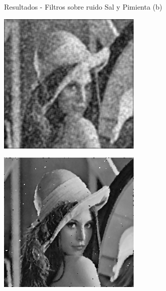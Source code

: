 \documentclass{beamer}
\begin{document}
\begin{frame}[fragile]{Resultados - Filtros sobre ruido Sal y Pimienta (b)}
\begin{minipage}{0.32\linewidth}
		\includegraphics[width=\linewidth]{../results/lena_ej12b1}
		\label{fig:lenaej12b1}
	\end{minipage}\hfill
	\begin{minipage}{0.32\linewidth}
		\centering
		\includegraphics[width=\linewidth]{../results/lena_ej12b2}
		\label{fig:lenaej12b2}
	\end{minipage}
\end{frame}
\end{document}
